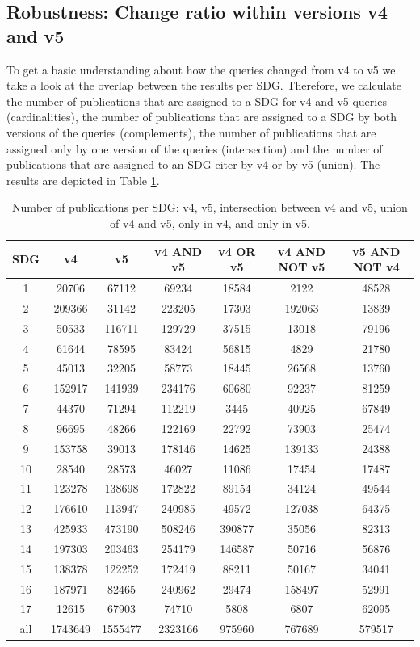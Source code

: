 \documentclass{article}
\begin{document}
\subsection{Robustness: Change ratio within versions v4 and v5}
\label{sec:robustness}
To get a basic understanding about how the queries changed from v4 to v5 we take a look at the overlap between the results per SDG. Therefore, we calculate the number of publications that are assigned to a SDG for v4 and v5 queries (cardinalities), the number of publications that are assigned to a SDG by both versions of the queries (complements), the number of publications that are assigned only by one version of the queries (intersection) and the number of publications that are assigned to an SDG eiter by v4 or by v5 (union). The results are depicted in Table \ref{venndataofpublications}.
\begin{table}[H]
\centering 
 \begin{tabular}{ccccccc}
 \toprule
  SDG & v4 & v5 & v4 AND v5 & v4 OR v5 & v4 AND NOT v5 & v5 AND NOT v4 \\
  \hline
 1 & 20706 & 67112 & 69234 & 18584 & 2122 & 48528 \\
 2 & 209366 & 31142 & 223205 & 17303 & 192063 & 13839 \\
 3 & 50533 & 116711 & 129729 & 37515 & 13018 & 79196 \\
 4 & 61644 & 78595 & 83424 & 56815 & 4829 & 21780 \\
 5 & 45013 & 32205 & 58773 & 18445 & 26568 & 13760 \\
 6 & 152917 & 141939 & 234176 & 60680 & 92237 & 81259 \\
 7 & 44370 & 71294 & 112219 & 3445 & 40925 & 67849 \\
 8 & 96695 & 48266 & 122169 & 22792 & 73903 & 25474 \\
 9 & 153758 & 39013 & 178146 & 14625 & 139133 & 24388 \\
 10 & 28540 & 28573 & 46027 & 11086 & 17454 & 17487 \\
 11 & 123278 & 138698 & 172822 & 89154 & 34124 & 49544 \\
 12 & 176610 & 113947 & 240985 & 49572 & 127038 & 64375 \\
 13 & 425933 & 473190 & 508246 & 390877 & 35056 & 82313 \\
 14 & 197303 & 203463 & 254179 & 146587 & 50716 & 56876 \\
 15 & 138378 & 122252 & 172419 & 88211 & 50167 & 34041 \\
 16 & 187971 & 82465 & 240962 & 29474 & 158497 & 52991 \\
 17 & 12615 & 67903 & 74710 & 5808 & 6807 & 62095 \\
 all & 1743649 & 1555477 & 2323166 & 975960 & 767689 & 579517 \\
 \bottomrule
\end{tabular}\caption{Number of publications per SDG: v4, v5, intersection between v4 and v5, union of v4 and v5, only in v4, and only in v5.}
\label{venndataofpublications}
\end{table}
\end{document}
